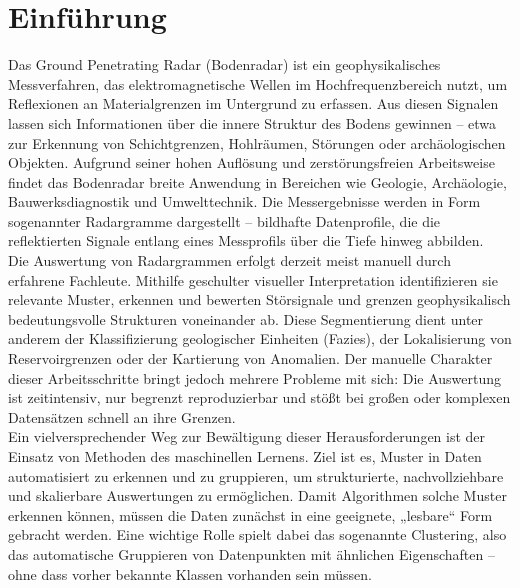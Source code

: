 \section{Einführung}

Das Ground Penetrating Radar (Bodenradar) ist ein geophysikalisches Messverfahren, das elektromagnetische Wellen im Hochfrequenzbereich nutzt, um Reflexionen an Materialgrenzen im Untergrund zu erfassen. Aus diesen Signalen lassen sich Informationen über die innere Struktur des Bodens gewinnen – etwa zur Erkennung von Schichtgrenzen, Hohlräumen, Störungen oder archäologischen Objekten. Aufgrund seiner hohen Auflösung und zerstörungsfreien Arbeitsweise findet das Bodenradar breite Anwendung in Bereichen wie Geologie, Archäologie, Bauwerksdiagnostik und Umwelttechnik. Die Messergebnisse werden in Form sogenannter Radargramme dargestellt – bildhafte Datenprofile, die die reflektierten Signale entlang eines Messprofils über die Tiefe hinweg abbilden.\\
Die Auswertung von Radargrammen erfolgt derzeit meist manuell durch erfahrene Fachleute. Mithilfe geschulter visueller Interpretation identifizieren sie relevante Muster, erkennen und bewerten Störsignale und grenzen geophysikalisch bedeutungsvolle Strukturen voneinander ab. Diese Segmentierung dient unter anderem der Klassifizierung geologischer Einheiten (Fazies), der Lokalisierung von Reservoirgrenzen oder der Kartierung von Anomalien. Der manuelle Charakter dieser Arbeitsschritte bringt jedoch mehrere Probleme mit sich: Die Auswertung ist zeitintensiv, nur begrenzt reproduzierbar und stößt bei großen oder komplexen Datensätzen schnell an ihre Grenzen. \\
Ein vielversprechender Weg zur Bewältigung dieser Herausforderungen ist der Einsatz von Methoden des maschinellen Lernens. Ziel ist es, Muster in Daten automatisiert zu erkennen und zu gruppieren, um strukturierte, nachvollziehbare und skalierbare Auswertungen zu ermöglichen. Damit Algorithmen solche Muster erkennen können, müssen die Daten zunächst in eine geeignete, „lesbare“ Form gebracht werden. Eine wichtige Rolle spielt dabei das sogenannte Clustering, also das automatische Gruppieren von Datenpunkten mit ähnlichen Eigenschaften – ohne dass vorher bekannte Klassen vorhanden sein müssen. \\
